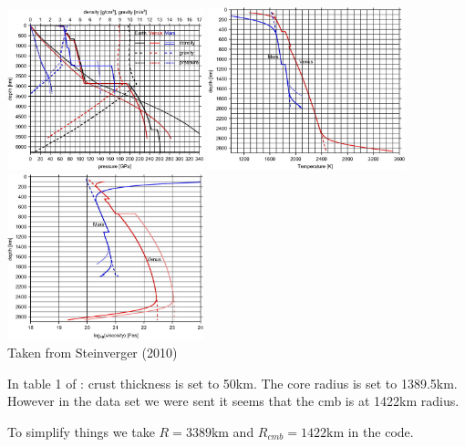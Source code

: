 \begin{center}
\includegraphics[width=5.7cm]{python_codes/fieldstone_96/images/stwt10_b}
\includegraphics[width=5.7cm]{python_codes/fieldstone_96/images/stwt10_c}
\includegraphics[width=5.7cm]{python_codes/fieldstone_96/images/stwt10_d}\\
{\captionfont Taken from Steinverger \etal (2010) \cite{stwt10}}
\end{center}

In table 1 of \cite{stwt10}: crust thickness is set to 50km. The core radius is set 
to 1389.5km. However in the data set we were sent it seems that the cmb is at 1422\si{\km}
radius.

To simplify things we take $R=3389\si{\km}$ and $R_{cmb}=1422\si{\km}$ in the code.
 
